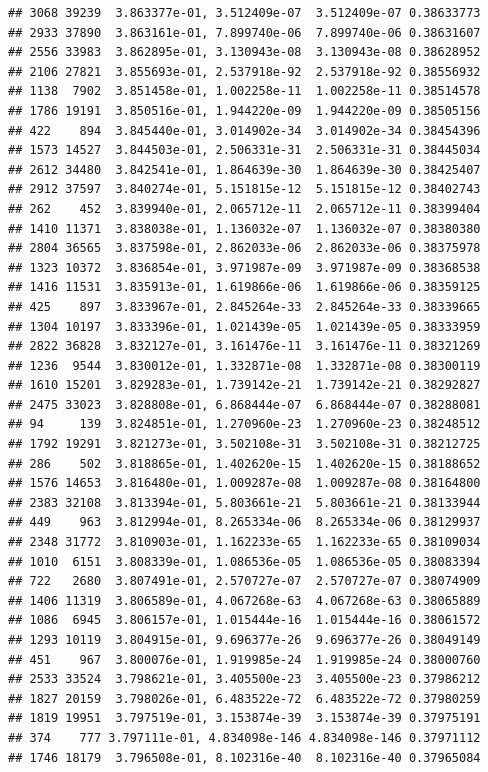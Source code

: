 \documentclass[
]{article}
\begin{document}
\begin{verbatim}
## 3068 39239  3.863377e-01, 3.512409e-07  3.512409e-07 0.38633773
## 2933 37890  3.863161e-01, 7.899740e-06  7.899740e-06 0.38631607
## 2556 33983  3.862895e-01, 3.130943e-08  3.130943e-08 0.38628952
## 2106 27821  3.855693e-01, 2.537918e-92  2.537918e-92 0.38556932
## 1138  7902  3.851458e-01, 1.002258e-11  1.002258e-11 0.38514578
## 1786 19191  3.850516e-01, 1.944220e-09  1.944220e-09 0.38505156
## 422    894  3.845440e-01, 3.014902e-34  3.014902e-34 0.38454396
## 1573 14527  3.844503e-01, 2.506331e-31  2.506331e-31 0.38445034
## 2612 34480  3.842541e-01, 1.864639e-30  1.864639e-30 0.38425407
## 2912 37597  3.840274e-01, 5.151815e-12  5.151815e-12 0.38402743
## 262    452  3.839940e-01, 2.065712e-11  2.065712e-11 0.38399404
## 1410 11371  3.838038e-01, 1.136032e-07  1.136032e-07 0.38380380
## 2804 36565  3.837598e-01, 2.862033e-06  2.862033e-06 0.38375978
## 1323 10372  3.836854e-01, 3.971987e-09  3.971987e-09 0.38368538
## 1416 11531  3.835913e-01, 1.619866e-06  1.619866e-06 0.38359125
## 425    897  3.833967e-01, 2.845264e-33  2.845264e-33 0.38339665
## 1304 10197  3.833396e-01, 1.021439e-05  1.021439e-05 0.38333959
## 2822 36828  3.832127e-01, 3.161476e-11  3.161476e-11 0.38321269
## 1236  9544  3.830012e-01, 1.332871e-08  1.332871e-08 0.38300119
## 1610 15201  3.829283e-01, 1.739142e-21  1.739142e-21 0.38292827
## 2475 33023  3.828808e-01, 6.868444e-07  6.868444e-07 0.38288081
## 94     139  3.824851e-01, 1.270960e-23  1.270960e-23 0.38248512
## 1792 19291  3.821273e-01, 3.502108e-31  3.502108e-31 0.38212725
## 286    502  3.818865e-01, 1.402620e-15  1.402620e-15 0.38188652
## 1576 14653  3.816480e-01, 1.009287e-08  1.009287e-08 0.38164800
## 2383 32108  3.813394e-01, 5.803661e-21  5.803661e-21 0.38133944
## 449    963  3.812994e-01, 8.265334e-06  8.265334e-06 0.38129937
## 2348 31772  3.810903e-01, 1.162233e-65  1.162233e-65 0.38109034
## 1010  6151  3.808339e-01, 1.086536e-05  1.086536e-05 0.38083394
## 722   2680  3.807491e-01, 2.570727e-07  2.570727e-07 0.38074909
## 1406 11319  3.806589e-01, 4.067268e-63  4.067268e-63 0.38065889
## 1086  6945  3.806157e-01, 1.015444e-16  1.015444e-16 0.38061572
## 1293 10119  3.804915e-01, 9.696377e-26  9.696377e-26 0.38049149
## 451    967  3.800076e-01, 1.919985e-24  1.919985e-24 0.38000760
## 2533 33524  3.798621e-01, 3.405500e-23  3.405500e-23 0.37986212
## 1827 20159  3.798026e-01, 6.483522e-72  6.483522e-72 0.37980259
## 1819 19951  3.797519e-01, 3.153874e-39  3.153874e-39 0.37975191
## 374    777 3.797111e-01, 4.834098e-146 4.834098e-146 0.37971112
## 1746 18179  3.796508e-01, 8.102316e-40  8.102316e-40 0.37965084

\end{verbatim}
\end{document}
